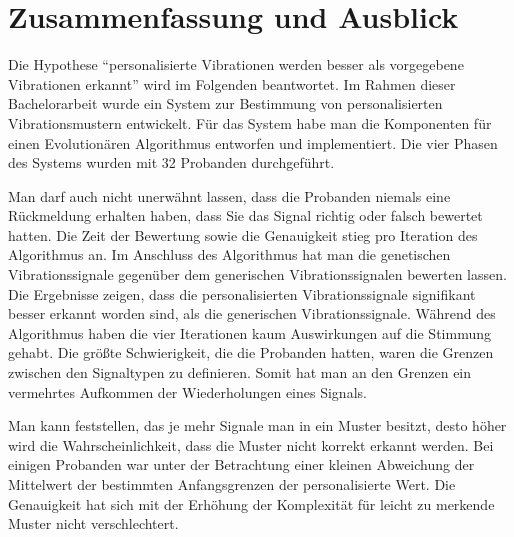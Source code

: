 
\chapter{Zusammenfassung und Ausblick}
\label{ch:Zusammenfassung}


Die Hypothese "`personalisierte Vibrationen werden besser als vorgegebene Vibrationen erkannt"' wird im Folgenden beantwortet.
Im Rahmen dieser Bachelorarbeit wurde ein System zur Bestimmung von personalisierten Vibrationsmustern entwickelt. 
F{\"u}r das System habe man die Komponenten f{\"u}r einen Evolution{\"a}ren Algorithmus entworfen und implementiert.
Die vier Phasen des Systems wurden mit 32 Probanden durchgef{\"u}hrt. 

Man darf auch nicht unerw{\"a}hnt lassen, dass die Probanden niemals eine R{\"u}ckmeldung erhalten haben, dass Sie das Signal richtig oder falsch bewertet hatten.
Die Zeit der Bewertung sowie die Genauigkeit stieg pro Iteration des Algorithmus an.
Im Anschluss des Algorithmus hat man die genetischen Vibrationssignale gegen{\"u}ber dem generischen Vibrationssignalen bewerten lassen. 
Die Ergebnisse zeigen, dass die personalisierten Vibrationssignale signifikant besser erkannt worden sind, als die generischen Vibrationssignale.
W{\"a}hrend des Algorithmus haben die vier Iterationen kaum Auswirkungen auf die Stimmung gehabt.
Die gr{\"o}{\ss}te Schwierigkeit, die die Probanden hatten, waren die Grenzen zwischen den Signaltypen zu definieren.
Somit hat man an den Grenzen ein vermehrtes Aufkommen der Wiederholungen eines Signals.

Man kann feststellen, das je mehr Signale man in ein Muster besitzt, desto h{\"o}her wird die Wahrscheinlichkeit, dass die Muster nicht korrekt erkannt werden. 
Bei einigen Probanden war unter der Betrachtung einer kleinen Abweichung der Mittelwert der bestimmten Anfangsgrenzen der personalisierte Wert.
Die Genauigkeit hat sich mit der Erh{\"o}hung der Komplexit{\"a}t f{\"u}r leicht zu merkende Muster nicht verschlechtert.

